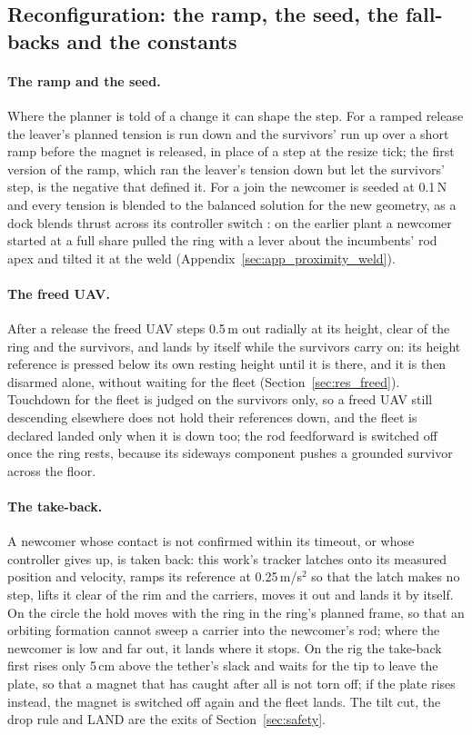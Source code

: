 \subsection{Reconfiguration: the ramp, the seed, the fall-backs and the constants}
\label{sec:app_reconfig}

\paragraph{The ramp and the seed.} Where the planner is told of a change it can shape the step. For a ramped
release the leaver's planned tension is run down and the survivors' run up over a short ramp before the magnet is
released, in place of a step at the resize tick; the first version of the ramp, which ran the leaver's tension
down but let the survivors' step, is the negative that defined it. For a join the newcomer is seeded at 0.1\,N and
every tension is blended to the balanced solution for the new geometry, as a dock blends thrust across its
controller switch \cite{sugihara2023trady}: on the earlier plant a newcomer started at a full share pulled the ring
with a lever about the incumbents' rod apex and tilted it at the weld (Appendix~\ref{sec:app_proximity_weld}).



\paragraph{The freed UAV.} After a release the freed UAV steps 0.5\,m out radially at its height, clear of the ring
and the survivors, and lands by itself while the survivors carry on: its height reference is pressed below its own
resting height until it is there, and it is then disarmed alone, without waiting for the fleet
(Section~\ref{sec:res_freed}). Touchdown for the fleet is judged on the survivors only, so a freed UAV still
descending elsewhere does not hold their references down, and the fleet is declared landed only when it is down
too; the rod feedforward is switched off once the ring rests, because its sideways component pushes a grounded
survivor across the floor.

\paragraph{The take-back.} A newcomer whose contact is not confirmed within its timeout, or whose controller gives
up, is taken back: this work's tracker latches onto its measured position and velocity, ramps its reference at
0.25\,m/s$^2$ so that the latch makes no step, lifts it clear of the rim and the carriers, moves it out and lands it
by itself. On the circle the hold moves with the ring in the ring's planned frame, so that an orbiting formation
cannot sweep a carrier into the newcomer's rod; where the newcomer is low and far out, it lands where it stops. On
the rig the take-back first rises only 5\,cm above the tether's slack and waits for the tip to leave the plate, so
that a magnet that has caught after all is not torn off; if the plate rises instead, the magnet is switched off
again and the fleet lands. The tilt cut, the drop rule and LAND are the exits of Section~\ref{sec:safety}.

